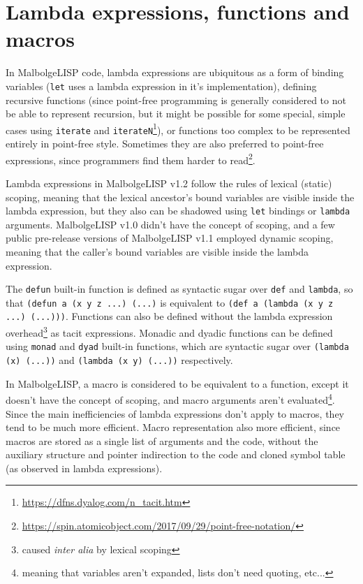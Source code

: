 \section{Lambda expressions, functions and macros}

\par In MalbolgeLISP code, lambda expressions are ubiquitous as a form of binding variables (\verb|let| uses a lambda expression in it's implementation), defining recursive functions (since point-free programming is generally considered to not be able to represent recursion, but it might be possible for some special, simple cases using \verb|iterate| and \verb|iterateN|\footnote{\url{https://dfns.dyalog.com/n_tacit.htm}}), or functions too complex to be represented entirely in point-free style. Sometimes they are also preferred to point-free expressions, since programmers find them harder to read\footnote{\url{https://spin.atomicobject.com/2017/09/29/point-free-notation/}}.

\par Lambda expressions in MalbolgeLISP v1.2 follow the rules of lexical (static) scoping, meaning that the lexical ancestor's bound variables are visible inside the lambda expression, but they also can be shadowed using \verb|let| bindings or \verb|lambda| arguments. MalbolgeLISP v1.0 didn't have the concept of scoping, and a few public pre-release versions of MalbolgeLISP v1.1 employed dynamic scoping, meaning that the caller's bound variables are visible inside the lambda expression.

\par The \verb|defun| built-in function is defined as syntactic sugar over \verb|def| and \verb|lambda|, so that \verb|(defun a (x y z ...) (...)| is equivalent to \verb|(def a (lambda (x y z ...) (...)))|. Functions can also be defined without the lambda expression overhead\footnote{caused \textit{inter alia} by lexical scoping} as tacit expressions. Monadic and dyadic functions can be defined using \verb|monad| and \verb|dyad| built-in functions, which are syntactic sugar over \verb|(lambda (x) (...))| and \verb|(lambda (x y) (...))| respectively.

\par In MalbolgeLISP, a macro is considered to be equivalent to a function, except it doesn't have the concept of scoping, and macro arguments aren't evaluated\footnote{meaning that variables aren't expanded, lists don't need quoting, etc...}. Since the main inefficiencies of lambda expressions don't apply to macros, they tend to be much more efficient. Macro representation also more efficient, since macros are stored as a single list of arguments and the code, without the auxiliary structure and pointer indirection to the code and cloned symbol table (as observed in lambda expressions).

